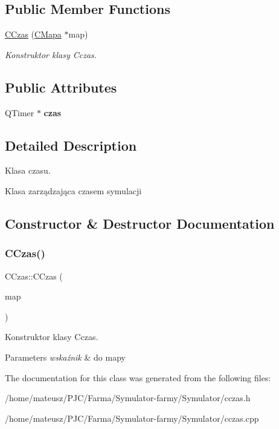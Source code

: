 \subsection*{Public Member Functions}
\begin{DoxyCompactItemize}
\item 
\mbox{\hyperlink{class_c_czas_abbc15f25b6a9941b659beb32e08456fb}{C\+Czas}} (\mbox{\hyperlink{class_c_mapa}{C\+Mapa}} $\ast$map)
\begin{DoxyCompactList}\small\item\em Konstruktor klasy Cczas. \end{DoxyCompactList}\end{DoxyCompactItemize}
\subsection*{Public Attributes}
\begin{DoxyCompactItemize}
\item 
\mbox{\label{class_c_czas_a4b2b51aadfd05a9f629f4d55701c4f3e}} 
Q\+Timer $\ast$ {\bfseries czas}
\end{DoxyCompactItemize}


\subsection{Detailed Description}
Klasa czasu. 

Klasa zarządzająca czasem symulacji 

\subsection{Constructor \& Destructor Documentation}
\mbox{\label{class_c_czas_abbc15f25b6a9941b659beb32e08456fb}} 
\subsubsection{\texorpdfstring{C\+Czas()}{CCzas()}}
{\footnotesize\ttfamily C\+Czas\+::\+C\+Czas (\begin{DoxyParamCaption}\item[{\mbox{\hyperlink{class_c_mapa}{C\+Mapa}} $\ast$}]{map }\end{DoxyParamCaption})}



Konstruktor klasy Cczas. 


\begin{DoxyParams}{Parameters}
{\em wskaźnik} & do mapy \\
\hline
\end{DoxyParams}


The documentation for this class was generated from the following files\+:\begin{DoxyCompactItemize}
\item 
/home/mateusz/\+P\+J\+C/\+Farma/\+Symulator-\/farmy/\+Symulator/cczas.\+h\item 
/home/mateusz/\+P\+J\+C/\+Farma/\+Symulator-\/farmy/\+Symulator/cczas.\+cpp\end{DoxyCompactItemize}
